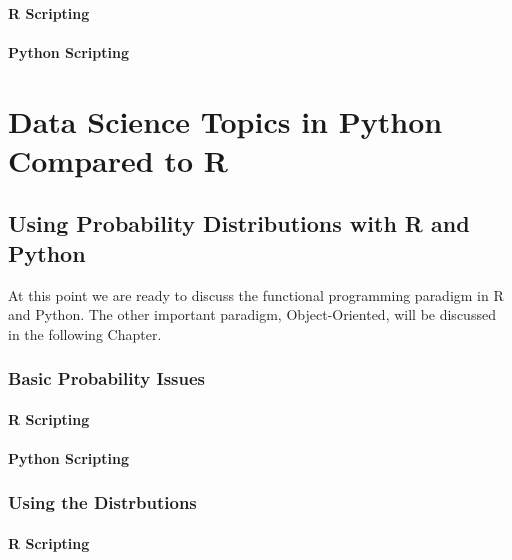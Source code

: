 \documentclass[]{book}
\theoremstyle{definition}
\theoremstyle{definition}
\theoremstyle{definition}
\theoremstyle{remark}
\begin{document}
\subsection{R Scripting}\label{r-scripting-3}

\subsection{Python Scripting}\label{python-scripting-3}

\part{Data Science Topics in Python Compared to
R}\label{part-data-science-topics-in-python-compared-to-r}

\chapter{Using Probability Distributions with R and
Python}\label{using-probability-distributions-with-r-and-python}

At this point we are ready to discuss the functional programming
paradigm in R and Python. The other important paradigm, Object-Oriented,
will be discussed in the following Chapter.

\section{Basic Probability Issues}\label{basic-probability-issues}

\subsection{R Scripting}\label{r-scripting-4}

\subsection{Python Scripting}\label{python-scripting-4}

\section{Using the Distrbutions}\label{using-the-distrbutions}

\subsection{R Scripting}\label{r-scripting-5}
\end{document}

